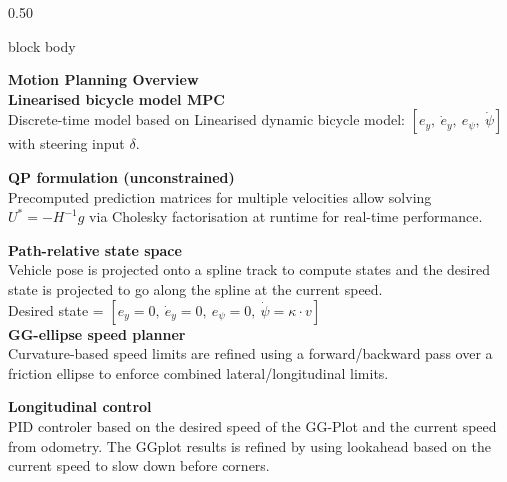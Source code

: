 \documentclass[final]{beamer}
\begin{document}
\begin{frame}[t,fragile]{}
\begin{columns}[t,totalwidth=\textwidth]
\begin{column}{0.50\textwidth}
\begin{beamercolorbox}[rounded=true,sep=0.38cm,wd=\linewidth]{block body}
    \vspace{0.3cm}
    \centering
    \begin{tcolorbox}[pbox]
    {\color{primary}\bfseries Motion Planning Overview}\\[3pt]
    \small
    \textbf{Linearised bicycle model MPC}\\
    Discrete-time model based on Linearised dynamic bicycle model:
    $[e_y,\ \dot e_y,\ e_\psi,\ \dot\psi]$ with steering input $\delta$.

    \textbf{QP formulation (unconstrained)}\\
    Precomputed prediction matrices for multiple velocities allow solving
    $U^{\ast} = -H^{-1} g$
    via Cholesky factorisation at runtime for real-time performance.

    \textbf{Path-relative state space}\\
    Vehicle pose is projected onto a spline track to compute states and the desired state is projected to go along the spline at the current speed.\\[4pt]
    Desired state = $[e_y = 0,\ \dot e_y = 0, \ e_\psi = 0,\ \dot\psi = \kappa \cdot v]$\\
    \textbf{GG-ellipse speed planner}\\
    Curvature-based speed limits are refined using a forward/backward pass
    over a friction ellipse to enforce combined lateral/longitudinal limits.

    \textbf{Longitudinal control}\\
    PID controler based on the desired speed of the GG-Plot and the current speed from odometry. The GGplot results is refined by using lookahead based on the current speed to slow down before corners.
    \end{tcolorbox}



\end{beamercolorbox}
\end{column}
\end{columns}
\end{frame}
\end{document}
